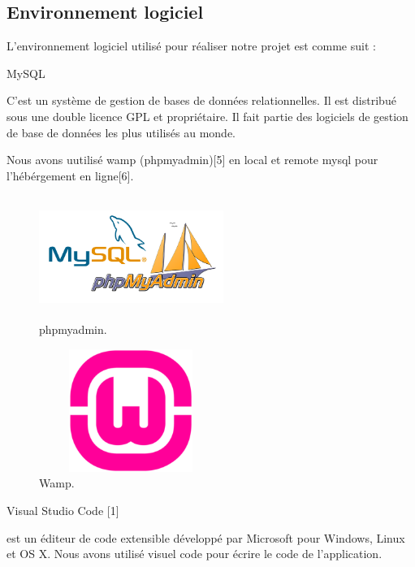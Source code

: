   \subsection{Environnement logiciel}


L'environnement logiciel utilis\'{e} pour r\'{e}aliser notre projet est comme suit : \newline


\textbullet{} MySQL

C'est un syst\`{e}me de gestion de bases de données relationnelles. Il est distribu\'{e}
sous une double licence GPL et propri\'{e}taire. Il fait partie des logiciels de gestion
de base de donn\'{e}es les plus utilis\'{e}s au monde.

Nous avons uutilis\'{e} wamp (phpmyadmin)[5]  en local et remote mysql pour l'h\'{e}b\'{e}rgement en ligne[6]. \newline



\FloatBarrier
\begin{figure}[H]
\center
\includegraphics[width=6cm,height=4cm]{./figures/teklogos/phpmyadmin.png}
\caption{phpmyadmin.}
\end{figure}
\FloatBarrier

\FloatBarrier
\begin{figure}[H]
\center
\includegraphics[width=6cm,height=4cm]{./figures/teklogos/wamp.png}
\caption{Wamp.}
\end{figure}
\FloatBarrier


\textbullet{} Visual Studio Code  [1]

est un \'{e}diteur de code extensible d\'{e}velopp\'{e} par Microsoft pour Windows,
Linux et OS X.
Nous avons utilis\'{e} visuel code pour \'{e}crire le code de l'application. \newline


